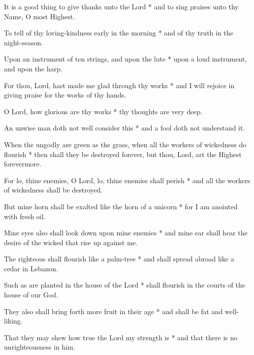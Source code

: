 It is a good thing to give thanks unto the Lord * and to sing praises unto thy Name, O most Highest.

To tell of thy loving-kindness early in the morning * and of thy truth in the night-season.

Upon an instrument of ten strings, and upon the lute * upon a loud instrument, and upon the harp.

For thou, Lord, hast made me glad through thy works * and I will rejoice in giving praise for the works of thy hands.

O Lord, how glorious are thy works * thy thoughts are very deep.

An unwise man doth not well consider this * and a fool doth not understand it.

When the ungodly are green as the grass, when all the workers of wickedness do flourish * then shall they be destroyed forever, but thou, Lord, art the Highest forevermore.

For lo, thine enemies, O Lord, lo, thine enemies shall perish * and all the workers of wickedness shall be destroyed.

But mine horn shall be exalted like the horn of a unicorn * for I am anointed with fresh oil.

Mine eyes also shall look down upon mine enemies * and mine ear shall hear the desire of the wicked that rise up against me.

The righteous shall flourish like a palm-tree * and shall spread abroad like a cedar in Lebanon.

Such as are planted in the house of the Lord * shall flourish in the courts of the house of our God.

They also shall bring forth more fruit in their age * and shall be fat and well-liking.

That they may shew how true the Lord my strength is * and that there is no unrighteousness in him.